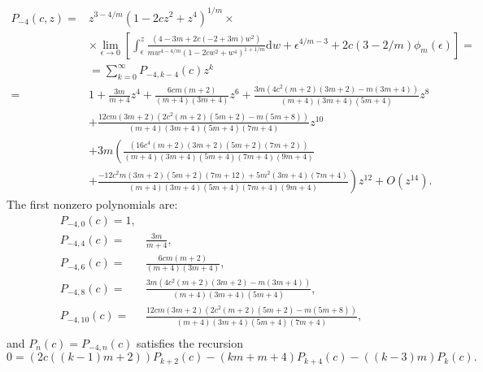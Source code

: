 \documentclass[review,nopreprintline]{elsarticle}
\theoremstyle{definition}
\numberwithin{equation}{section}
\theoremstyle{remark}
\begin{document}
	        \begin{align*}
	            P_{-4}(c,z)=&z^{3-4/m} (1-2 c z^2+z^4)^{1/m}\times\\
	            &\times\lim_{\epsilon\to 0}\left[\int_{\epsilon}^{z} \frac{(4-3 m+2 c(-2+3 m) w^2)}{mw^{4-4/m} (1-2 c w^2+w^4)^{1+1/m}}  \textrm{d}w+\epsilon^{4/m-3}+2c(3-2/m)\phi_m(\epsilon)\right]=\\
	            &= \sum _{k=0}^{\infty }P_{-4,k-4}(c) z^{k}\\
	            =& 1+\frac{3 m }{m+4}z^4+\frac{6 c m (m+2) }{(m+4) (3 m+4)}z^6 +\frac{3 m  \left(4 c^2 (m+2) (3 m+2)-m (3 m+4)\right)}{(m+4) (3 m+4) (5 m+4)}z^8\\
	            &+\frac{12 c m (3 m+2)  \left(2 c^2 (m+2) (5 m+2)-m (5 m+8)\right)}{(m+4) (3 m+4) (5 m+4) (7 m+4)}z^{10}\\
	            &+3 m\left(\frac{  (16 c^4 (m+2) (3 m+2) (5 m+2) (7 m+2))}{(m+4) (3 m+4) (5 m+4) (7 m+4) (9 m+4)}\right. \\
	            &+\left.\frac{-12 c^2 m (3 m+2) (5 m+2) (7 m+12)+5 m^2 (3 m+4) (7 m+4)}{(m+4) (3 m+4) (5 m+4) (7 m+4) (9 m+4)}\right)z^{12} + O(z^{14}).
	        \end{align*}
	         The first  nonzero polynomials are:
	        \begin{align*}
	            P_{-4,0}(c) = 1,\\
	            P_{-4,4}(c)=&\frac{3 m }{m+4}, \\
	            P_{-4,6}(c)=&\frac{6 c m (m+2) }{(m+4) (3 m+4)}, \\
	            P_{-4,8}(c)=&\frac{3 m  \left(4 c^2 (m+2) (3 m+2)-m (3 m+4)\right)}{(m+4) (3 m+4) (5 m+4)}, \\
	            P_{-4,10}(c)=&\frac{12 c m (3 m+2)  \left(2 c^2 (m+2) (5 m+2)-m (5 m+8)\right)}{(m+4) (3 m+4) (5 m+4) (7 m+4)}, \\
	        \end{align*}
	        and $P_n(c)=P_{-4,n}(c)$ satisfies the  recursion
	        \begin{equation}\label{recursion}
	            0=(2 c ((k-1) m+2)) P_{k+2}(c)-(k m+m+4) P_{k+4}(c)-((k-3) m) P_k(c).
	        \end{equation}
	        
\end{document}
